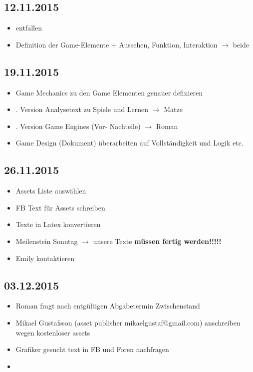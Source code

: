 \subsection{12.11.2015}
\begin{itemize}
\item \circledmark\quad entfallen
\item \circledmark\quad Definition der Game-Elemente + Aussehen, Funktion, Interaktion $\rightarrow$ beide

\end{itemize}

\subsection{19.11.2015}
\begin{itemize}
\item \circledmark\quad Game Mechanics zu den Game Elementen genauer definieren
\item \circledmark{}. Version Analysetext zu Spiele und Lernen $\rightarrow$ Matze
\item \circledmark{}. Version Game Engines (Vor- Nachteile) $\rightarrow$ Roman
\item \circledmark\quad Game Design (Dokument) überarbeiten auf Vollständigkeit und Logik etc.
\end{itemize}

\subsection{26.11.2015}
\begin{itemize}
\item \circledmark\quad Assets Liste auswählen
\item \circledmark\quad FB Text für Assets schreiben
\item \circledmark\quad Texte in Latex konvertieren 
\item \circledmark\quad  Meilenstein Sonntag $\rightarrow$  unsere Texte \bfseries{müssen} fertig werden!!!!!  
\item \circledmark\quad  Emily kontaktieren
\end{itemize}


\subsection{03.12.2015}
\begin{itemize}
\item \circledmark\quad Roman fragt nach entgültigen Abgabetermin Zwischenstand
\item Mikael Gustafsson (asset publisher mikaelgustaf@gmail.com) anschreiben wegen kostenloser assets
\item \circledmark\quad Grafiker gesucht text in FB und Foren nachfragen
\item 
\end{itemize}

